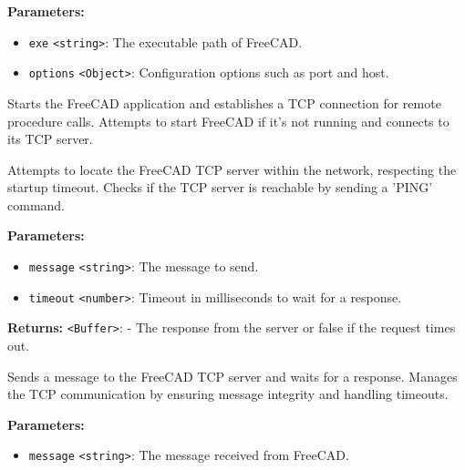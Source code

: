 \documentclass[12pt,a4paper]{article}
\begin{document}
\noindent \textbf{Parameters:}
\begin{itemize}
  \item \texttt{exe} \texttt{<string>}: The executable path of FreeCAD.
  \item \texttt{options} \texttt{<Object>}: Configuration options such as port and host.
\end{itemize}

\noindent Starts the FreeCAD application and establishes a TCP connection for remote procedure calls.
Attempts to start FreeCAD if it's not running and connects to its TCP server.

\vspace{5mm}
\noindent {}


\noindent Attempts to locate the FreeCAD TCP server within the network, respecting the startup timeout.
Checks if the TCP server is reachable by sending a 'PING' command.

\vspace{5mm}
\noindent {}


\noindent \textbf{Parameters:}
\begin{itemize}
  \item \texttt{message} \texttt{<string>}: The message to send.
  \item \texttt{timeout} \texttt{<number>}: Timeout in milliseconds to wait for a response.
\end{itemize}

\noindent \textbf{Returns:} \texttt{<Buffer>}: - The response from the server or false if the request times out.

\noindent Sends a message to the FreeCAD TCP server and waits for a response.
Manages the TCP communication by ensuring message integrity and handling timeouts.

\vspace{5mm}
\noindent {}


\noindent \textbf{Parameters:}
\begin{itemize}
  \item \texttt{message} \texttt{<string>}: The message received from FreeCAD.
\end{itemize}
\end{document}
